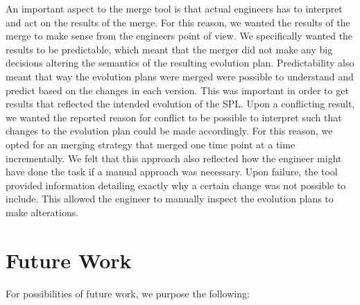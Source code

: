 \documentclass[a4paper,english]{ifimaster}
\begin{document}
An important aspect to the merge tool is that actual engineers has to interpret and act on the results of the merge. For this reason, we wanted the results of the merge to make sense from the engineers point of view. We specifically wanted the results to be predictable, which meant that the merger did not make any big decisions altering the semantics of the resulting evolution plan. Predictability also meant that way the evolution plans were merged were possible to understand and predict based on the changes in each version. This was important in order to get results that reflected the intended evolution of the SPL. Upon a conflicting result, we wanted the reported reason for conflict to be possible to interpret such that changes to the evolution plan could be made accordingly. For this reason, we opted for an merging strategy that merged one time point at a time incrementally. We felt that this approach also reflected how the engineer might have done the task if a manual approach was necessary. Upon failure, the tool provided information detailing exactly why a certain change was not possible to include. This allowed the engineer to manually inspect the evolution plans to make alterations.

\section{Future Work}%
\label{sec:future_work}

For possibilities of future work, we purpose the following:
\end{document}
